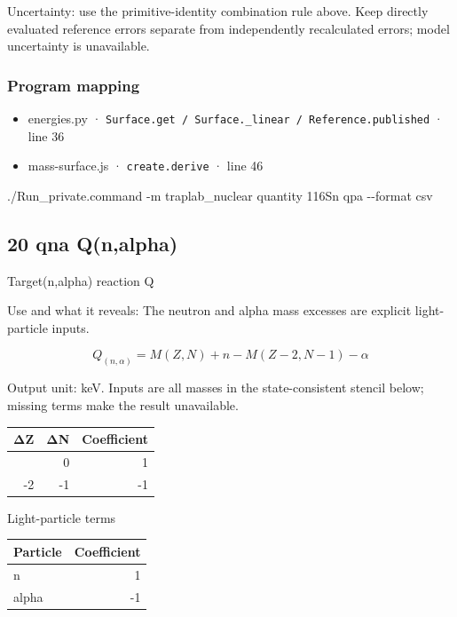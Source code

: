 \documentclass[
  11pt,
  letterpaper,
]{article}
\newenvironment{Shaded}{}{}
\newcommand{\AttributeTok}[1]{\textcolor[rgb]{0.49,0.56,0.16}{#1}}
\newcommand{\ExtensionTok}[1]{#1}
\newcommand{\NormalTok}[1]{#1}
\providecommand{\tightlist}{%
  \setlength{\itemsep}{0pt}\setlength{\parskip}{0pt}}
\begin{document}
Uncertainty: use the primitive-identity combination rule above. Keep
directly evaluated reference errors separate from independently
recalculated errors; model uncertainty is unavailable.

\subsubsection{Program mapping}\label{program-mapping-18}

\begin{itemize}
\tightlist
\item
  energies.py ·
  \texttt{Surface.get\ /\ Surface.\_linear\ /\ Reference.published} ·
  line 36
\item
  mass-surface.js · \texttt{create.derive} · line 46
\end{itemize}

\begin{Shaded}
\begin{Highlighting}[]
\ExtensionTok{./Run\_private.command} \AttributeTok{{-}m}\NormalTok{ traplab\_nuclear quantity 116Sn qpa }\AttributeTok{{-}{-}format}\NormalTok{ csv}
\end{Highlighting}
\end{Shaded}

\subsection{20 qna Q(n,alpha)}\label{qna-qnalpha}

Target(n,alpha) reaction Q

Use and what it reveals: The neutron and alpha mass excesses are
explicit light-particle inputs.

\[
Q_{(n,\alpha)}=M(Z,N)+n-M(Z-2,N-1)-\alpha
\]

Output unit: keV. Inputs are all masses in the state-consistent stencil
below; missing terms make the result unavailable.

\begin{longtable}[]{@{}rrr@{}}
\toprule\noalign{}
ΔZ & ΔN & Coefficient \\
\midrule\noalign{}
\endhead
\bottomrule\noalign{}
\endlastfoot
0 & 0 & 1 \\
-2 & -1 & -1 \\
\end{longtable}

Light-particle terms

\begin{longtable}[]{@{}lr@{}}
\toprule\noalign{}
Particle & Coefficient \\
\midrule\noalign{}
\endhead
\bottomrule\noalign{}
\endlastfoot
n & 1 \\
alpha & -1 \\
\end{longtable}
\end{document}

